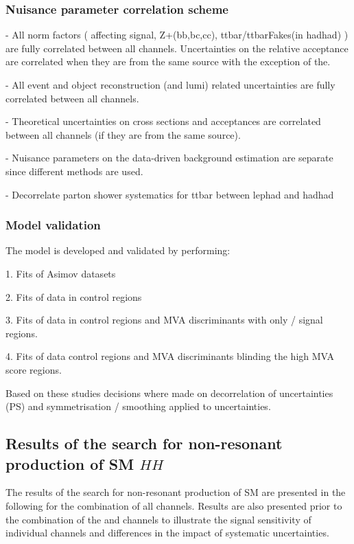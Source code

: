\subsubsection{Nuisance parameter correlation scheme}

- All norm factors ( affecting signal, Z+(bb,bc,cc),
ttbar/ttbarFakes(in hadhad) ) are fully correlated between all
channels. Uncertainties on the relative acceptance are correlated when
they are from the same source with the exception of the.

- All event and object reconstruction (and lumi) related uncertainties
are fully correlated between all channels.

- Theoretical uncertainties on cross sections and acceptances are
correlated between all channels (if they are from the same source).

- Nuisance parameters on the data-driven background estimation are
separate since different methods are used.

- Decorrelate parton shower systematics for ttbar between lephad and
hadhad


\subsubsection{Model validation}

The model is developed and validated by performing:

1. Fits of Asimov datasets

2. Fits of data in control regions

3. Fits of data in control regions and MVA discriminants with only
\hadhad / \lephad signal regions.

4. Fits of data control regions and MVA discriminants blinding the
high MVA score regions.

Based on these studies decisions where made on decorrelation of
uncertainties (PS) and symmetrisation / smoothing applied to
uncertainties.


\subsection{Results of the search for non-resonant production of SM $HH$}
\label{sec:results_nonres}


The results of the search for non-resonant production of SM \HH are
presented in the following for the combination of all
channels. Results are also presented prior to the combination of the
\hadhad and \lephad channels to illustrate the signal sensitivity of
individual channels and differences in the impact of systematic
uncertainties.

